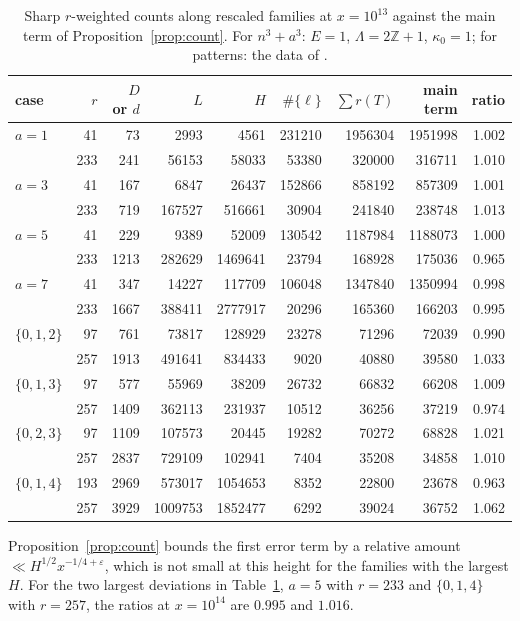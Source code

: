 \documentclass[11pt]{amsart}
\theoremstyle{remark}
\theoremstyle{definition}
\numberwithin{equation}{section}
\newcommand{\Z}{\mathbb{Z}}
\newcommand{\eps}{\varepsilon}
\begin{document}
\begin{table}[h]
\centering\small
\setlength{\tabcolsep}{5pt}
\begin{tabular}{lrrrrrrrr}
\toprule
case & $r$ & $D$ or $d$ & $L$ & $H$ & $\#\{\ell\}$ & $\sum r(T)$ & main term & ratio\\
\midrule
$a=1$ & 41 & 73 & 2993 & 4561 & 231210 & 1956304 & 1951998 & 1.002\\
 & 233 & 241 & 56153 & 58033 & 53380 & 320000 & 316711 & 1.010\\
$a=3$ & 41 & 167 & 6847 & 26437 & 152866 & 858192 & 857309 & 1.001\\
 & 233 & 719 & 167527 & 516661 & 30904 & 241840 & 238748 & 1.013\\
$a=5$ & 41 & 229 & 9389 & 52009 & 130542 & 1187984 & 1188073 & 1.000\\
 & 233 & 1213 & 282629 & 1469641 & 23794 & 168928 & 175036 & 0.965\\
$a=7$ & 41 & 347 & 14227 & 117709 & 106048 & 1347840 & 1350994 & 0.998\\
 & 233 & 1667 & 388411 & 2777917 & 20296 & 165360 & 166203 & 0.995\\
$\{0,1,2\}$ & 97 & 761 & 73817 & 128929 & 23278 & 71296 & 72039 & 0.990\\
 & 257 & 1913 & 491641 & 834433 & 9020 & 40880 & 39580 & 1.033\\
$\{0,1,3\}$ & 97 & 577 & 55969 & 38209 & 26732 & 66832 & 66208 & 1.009\\
 & 257 & 1409 & 362113 & 231937 & 10512 & 36256 & 37219 & 0.974\\
$\{0,2,3\}$ & 97 & 1109 & 107573 & 20445 & 19282 & 70272 & 68828 & 1.021\\
 & 257 & 2837 & 729109 & 102941 & 7404 & 35208 & 34858 & 1.010\\
$\{0,1,4\}$ & 193 & 2969 & 573017 & 1054653 & 8352 & 22800 & 23678 & 0.963\\
 & 257 & 3929 & 1009753 & 1852477 & 6292 & 39024 & 36752 & 1.062\\
\bottomrule
\end{tabular}
\caption{Sharp $r$-weighted counts along rescaled families at $x=10^{13}$ against the main term of Proposition~\ref{prop:count}. For $n^3+a^3$: $E=1$, $\Lambda=2\Z+1$, $\kappa_0=1$; for patterns: the data of \cite[Table~3]{IC}.}
\label{tab:main}
\end{table}

Proposition~\ref{prop:count} bounds the first error term by a relative amount $\ll H^{1/2}x^{-1/4+\eps}$, which is not small at this height for the families with the largest $H$. For the two largest deviations in Table~\ref{tab:main}, $a=5$ with $r=233$ and $\{0,1,4\}$ with $r=257$, the ratios at $x=10^{14}$ are $0.995$ and $1.016$.
\end{document}
